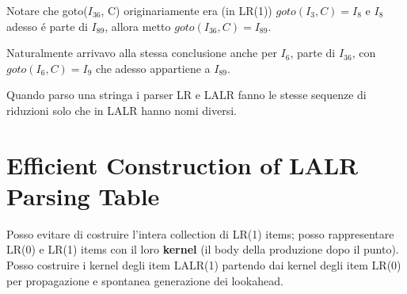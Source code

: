 Notare che goto($I_{36}$, C) originariamente era (in LR(1)) $goto(I_3, C) = I_8$ e $I_8$ adesso \'e parte di $I_{89}$, allora 
metto $goto(I_{36}, C) = I_{89}$. 

Naturalmente arrivavo alla stessa conclusione anche per $I_6$, parte di $I_{36}$, con $goto(I_6, C) =  I_9$ che adesso appartiene a $I_{89}$.

Quando parso una stringa i parser LR e LALR fanno le stesse sequenze di riduzioni solo che in LALR hanno nomi diversi. 

\section{Efficient Construction of LALR Parsing Table}
Posso evitare di costruire l'intera collection di LR(1) items; posso rappresentare LR(0) e LR(1) items con il loro \textbf{kernel}
(il body della produzione dopo il punto).
Posso costruire i kernel degli item LALR(1) partendo dai kernel degli item LR(0) per propagazione e spontanea generazione dei lookahead. 
